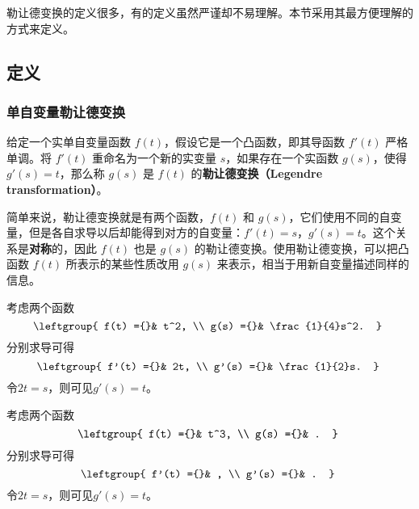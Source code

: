 

勒让德变换的定义很多，有的定义虽然严谨却不易理解。本节采用其最方便理解的方式来定义。

\subsection{定义}

\subsubsection{单自变量勒让德变换}
\begin{definition}{}
给定一个实单自变量函数 $f(t)$，假设它是一个凸函数，即其导函数 $f'(t)$ 严格单调。将 $f'(t)$ 重命名为一个新的实变量 $s$，如果存在一个实函数 $g(s)$，使得 $g'(s)=t$，那么称 $g(s)$ 是 $f(t)$ 的\textbf{勒让德变换（Legendre transformation）}。
\end{definition}

简单来说，勒让德变换就是有两个函数，$f(t)$ 和 $g(s)$，它们使用不同的自变量，但是各自求导以后却能得到对方的自变量：$f'(t)=s$，$g'(s)=t$。这个关系是\textbf{对称}的，因此 $f(t)$ 也是 $g(s)$ 的勒让德变换。使用勒让德变换，可以把凸函数 $f(t)$ 所表示的某些性质改用 $g(s)$ 来表示，相当于用新自变量描述同样的信息。



\begin{example}{}
考虑两个函数
\begin{equation}
\leftgroup{
    f(t) ={}& t^2, \\
    g(s) ={}& \frac{1}{4}s^2. 
}~
\end{equation}
分别求导可得
\begin{equation}
\leftgroup{
    f'(t) ={}& 2t, \\
    g'(s) ={}& \frac{1}{2}s. 
}~
\end{equation}
令$2t=s$，则可见$g'(s)=t$。
\end{example}



\begin{example}{}
考虑两个函数
\begin{equation}
\leftgroup{
    f(t) ={}& t^3, \\
    g(s) ={}& . 
}~
\end{equation}
分别求导可得
\begin{equation}
\leftgroup{
    f'(t) ={}& , \\
    g'(s) ={}& . 
}~
\end{equation}
令$2t=s$，则可见$g'(s)=t$。
\end{example}




